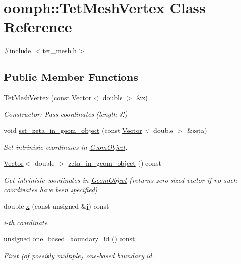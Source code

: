 \hypertarget{classoomph_1_1TetMeshVertex}{}\section{oomph\+:\+:Tet\+Mesh\+Vertex Class Reference}
\label{classoomph_1_1TetMeshVertex}


{\ttfamily \#include $<$tet\+\_\+mesh.\+h$>$}

\subsection*{Public Member Functions}
\begin{DoxyCompactItemize}
\item 
\hyperlink{classoomph_1_1TetMeshVertex_af76c065906c82fa548ce145b6d34e7e1}{Tet\+Mesh\+Vertex} (const \hyperlink{classoomph_1_1Vector}{Vector}$<$ double $>$ \&\hyperlink{classoomph_1_1TetMeshVertex_af579c7e0bb184bc2d67aa31f25872a2b}{x})
\begin{DoxyCompactList}\small\item\em Constructor\+: Pass coordinates (length 3!) \end{DoxyCompactList}\item 
void \hyperlink{classoomph_1_1TetMeshVertex_a25bf54df192efe3bdb74bc67983dea34}{set\+\_\+zeta\+\_\+in\+\_\+geom\+\_\+object} (const \hyperlink{classoomph_1_1Vector}{Vector}$<$ double $>$ \&zeta)
\begin{DoxyCompactList}\small\item\em Set intrinisic coordinates in \hyperlink{classoomph_1_1GeomObject}{Geom\+Object}. \end{DoxyCompactList}\item 
\hyperlink{classoomph_1_1Vector}{Vector}$<$ double $>$ \hyperlink{classoomph_1_1TetMeshVertex_a6d6ea2c9ca186e0a377505f37800ddaa}{zeta\+\_\+in\+\_\+geom\+\_\+object} () const
\begin{DoxyCompactList}\small\item\em Get intrinisic coordinates in \hyperlink{classoomph_1_1GeomObject}{Geom\+Object} (returns zero sized vector if no such coordinates have been specified) \end{DoxyCompactList}\item 
double \hyperlink{classoomph_1_1TetMeshVertex_af579c7e0bb184bc2d67aa31f25872a2b}{x} (const unsigned \&\hyperlink{cfortran_8h_adb50e893b86b3e55e751a42eab3cba82}{i}) const
\begin{DoxyCompactList}\small\item\em i-\/th coordinate \end{DoxyCompactList}\item 
unsigned \hyperlink{classoomph_1_1TetMeshVertex_a844ff66de0e3ed28b3ad186c81e6d0c7}{one\+\_\+based\+\_\+boundary\+\_\+id} () const
\begin{DoxyCompactList}\small\item\em First (of possibly multiple) one-\/based boundary id. \end{DoxyCompactList}\end{DoxyCompactItemize}
